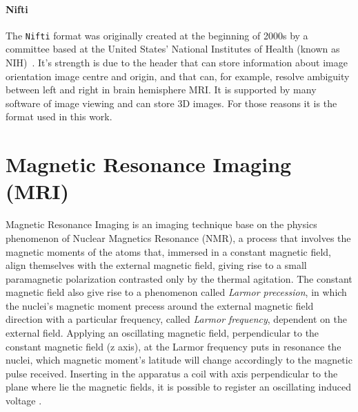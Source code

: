 \documentclass{standalone}
\begin{document}
\paragraph{Nifti}
The \texttt{Nifti} format was originally created at the beginning of 2000s by a committee based at the United States' National Institutes of Health (known as NIH)~\cite{ART:Larobina}.
It's strength is due to the header that can store information about image orientation image centre and origin, and that can, for example, resolve ambiguity between left and right in brain hemisphere MRI.
It is supported by many software of image viewing and can store 3D images. For those reasons it is the format used in this work.



\section{Magnetic Resonance Imaging (MRI)}
Magnetic Resonance Imaging is an imaging technique base on the physics phenomenon of Nuclear Magnetics Resonance (NMR), a process that involves the magnetic moments of the atoms that, immersed in a constant magnetic field, align themselves with the external magnetic field, giving rise to a small paramagnetic polarization contrasted only by the thermal agitation. 
The constant magnetic field also give rise to a phenomenon called \textit{Larmor precession}, in which the nuclei's magnetic moment precess  around the external magnetic field direction with a particular frequency, called \textit{Larmor frequency}, dependent on the external field.
Applying an oscillating magnetic field, perpendicular to the constant magnetic field (z axis), at the Larmor frequency puts in resonance the nuclei, which magnetic moment's latitude will change accordingly to the magnetic pulse received. Inserting in the apparatus a coil with axis perpendicular to the plane where lie the magnetic fields, it is possible to register an oscillating induced voltage \cite{ART:Bloch}.
\end{document}
